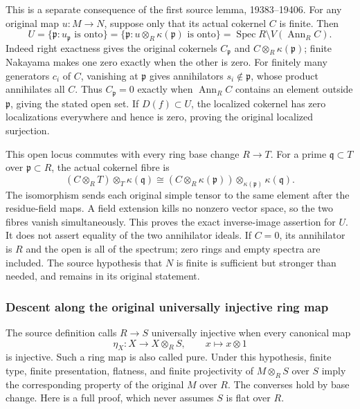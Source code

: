 This is a separate consequence of the first source lemma, 19383--19406. For any original map \(u:M\to N\), suppose only that its actual cokernel \(C\) is finite. Then \[
U=\{\mathfrak p:u_{\mathfrak p}\text{ is onto}\}
=\{\mathfrak p:u\otimes_R\kappa(\mathfrak p)\text{ is onto}\}
=\operatorname{Spec}R\setminus V(\operatorname{Ann}_RC).
\] Indeed right exactness gives the original cokernels \(C_{\mathfrak p}\) and \(C\otimes_R\kappa(\mathfrak p)\); finite Nakayama makes one zero exactly when the other is zero. For finitely many generators \(c_i\) of \(C\), vanishing at \(\mathfrak p\) gives annihilators \(s_i\notin\mathfrak p\), whose product annihilates all \(C\). Thus \(C_{\mathfrak p}=0\) exactly when \(\operatorname{Ann}_RC\) contains an element outside \(\mathfrak p\), giving the stated open set. If \(D(f)\subset U\), the localized cokernel has zero localizations everywhere and hence is zero, proving the original localized surjection.

This open locus commutes with every ring base change \(R\to T\). For a prime \(\mathfrak q\subset T\) over \(\mathfrak p\subset R\), the actual cokernel fibre is \[
(C\otimes_RT)\otimes_T\kappa(\mathfrak q)
\cong (C\otimes_R\kappa(\mathfrak p))\otimes_{\kappa(\mathfrak p)}\kappa(\mathfrak q).
\] The isomorphism sends each original simple tensor to the same element after the residue-field maps. A field extension kills no nonzero vector space, so the two fibres vanish simultaneously. This proves the exact inverse-image assertion for \(U\). It does not assert equality of the two annihilator ideals. If \(C=0\), its annihilator is \(R\) and the open is all of the spectrum; zero rings and empty spectra are included. The source hypothesis that \(N\) is finite is sufficient but stronger than needed, and remains in its original statement.

\subsubsection{Descent along the original universally injective ring map}\label{algebra-proof-010-descent-along-the-original-universally-injective-ring-map}

The source definition calls \(R\to S\) universally injective when every canonical map \[
\eta_X:X\to X\otimes_RS,\qquad x\mapsto x\otimes1
\] is injective. Such a ring map is also called pure. Under this hypothesis, finite type, finite presentation, flatness, and finite projectivity of \(M\otimes_RS\) over \(S\) imply the corresponding property of the original \(M\) over \(R\). The converses hold by base change. Here is a full proof, which never assumes \(S\) is flat over \(R\).


